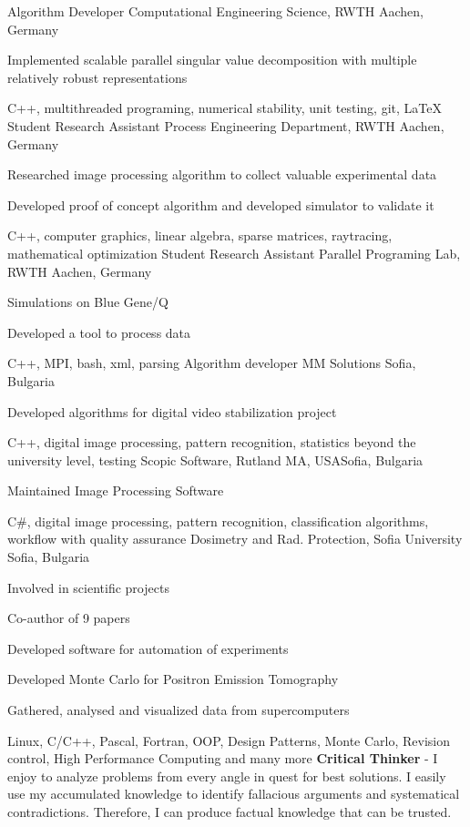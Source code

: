 {Algorithm Developer}
{Computational Engineering Science, RWTH}
{Aachen, Germany}
{ \item Implemented scalable parallel singular value decomposition with multiple relatively robust representations}
{C++, multithreaded programing, numerical stability, unit testing, git, \LaTeX}
{Student Research Assistant} 
{Process Engineering Department, RWTH}
{Aachen, Germany}
{ \item Researched image processing algorithm to collect valuable experimental data}
{ 
\item Developed proof of concept algorithm and developed simulator to validate it}
{C++, computer graphics, linear algebra, sparse matrices, raytracing, mathematical optimization}
{Student Research Assistant}
{Parallel Programing Lab, RWTH}
{Aachen, Germany}
{\item Simulations on Blue Gene/Q}
{\item Developed a tool to process data}
{ C++, MPI, bash, xml, parsing}
{Algorithm developer}
{MM Solutions}
{Sofia, Bulgaria}
{ \item Developed algorithms for digital video stabilization project}
{C++, digital image processing, pattern recognition, statistics beyond the university level, testing}
{Scopic Software, Rutland MA, USA}{Sofia, Bulgaria}
{\item Maintained Image Processing Software}
{C\#, digital image processing, pattern recognition, classification algorithms, workflow with quality assurance}
{Dosimetry and Rad. Protection, Sofia University} {Sofia, Bulgaria}
{
 \item Involved in scientific projects 
 \item Co-author of 9 papers
 \item Developed software for automation of experiments
}
{ 
 \item Developed Monte Carlo for Positron Emission Tomography
 \item Gathered, analysed and visualized data from supercomputers
}
{Linux, C/C++, Pascal, Fortran, OOP, Design Patterns, Monte Carlo, Revision control, High Performance Computing and many more}
\vspace{-0.8cm}
\small
\textbf{Critical Thinker} - I enjoy to analyze problems from every angle in quest for best solutions. I easily use my accumulated knowledge to identify fallacious arguments and systematical contradictions. Therefore, I can produce factual knowledge that can be trusted.\\
